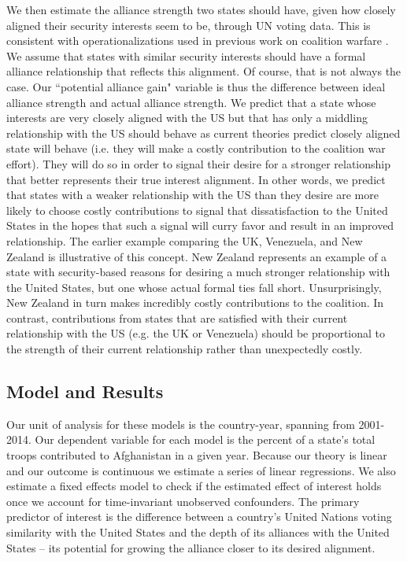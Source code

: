 \documentclass[12pt,letterpaper]{article}
\begin{document}
		We then estimate the alliance strength two states should have, given how closely aligned their security interests seem to be, through UN voting data. This is consistent with operationalizations used in previous work on coalition warfare \citep{wolford_politicsmilitarycoalitions_2015}. We assume that states with similar security interests should have a formal alliance relationship that reflects this alignment. Of course, that is not always the case. Our ``potential alliance gain" variable is thus the difference between ideal alliance strength and actual alliance strength. We predict that a state whose interests are very closely aligned with the US but that has only a middling relationship with the US should behave as current theories predict closely aligned state will behave (i.e. they will make a costly contribution to the coalition war effort). They will do so in order to signal their desire for a stronger relationship that better represents their true interest alignment. In other words, we predict that states with a weaker relationship with the US than they desire are more likely to choose costly contributions to signal that dissatisfaction to the United States in the hopes that such a signal will curry favor and result in an improved relationship. The earlier example comparing the UK, Venezuela, and New Zealand is illustrative of this concept. New Zealand represents an example of a state with security-based reasons for desiring a much stronger relationship with the United States, but one whose actual formal ties fall short. Unsurprisingly, New Zealand in turn makes incredibly costly contributions to the coalition. In contrast, contributions from states that are satisfied with their current relationship with the US (e.g. the UK or Venezuela) should be proportional to the strength of their current relationship rather than unexpectedly costly.
		
	\subsection{Model and Results}
		Our unit of analysis for these models is the country-year, spanning from 2001-2014. Our dependent variable for each model is the percent of a state's total troops contributed to Afghanistan in a given year. Because our theory is linear and our outcome is continuous we estimate a series of linear regressions. We also estimate a fixed effects model to check if the estimated effect of interest holds once we account for time-invariant unobserved confounders. The primary predictor of interest is the difference between a country's United Nations voting similarity with the United States and the depth of its alliances with the United States -- its potential for growing the alliance closer to its desired alignment.
\end{document}
